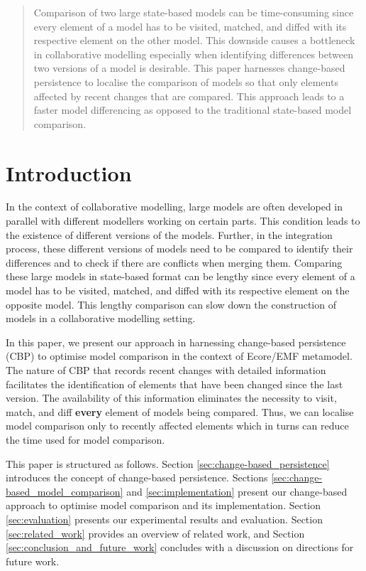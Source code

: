 \documentclass{llncs}
\begin{document}
\begin{abstract}
Comparison of two large state-based models can be time-consuming since every element of a model has to be visited, matched, and diffed with its respective element on the other model. This downside causes a bottleneck in collaborative modelling especially when identifying differences between two versions of a model is desirable. This paper harnesses change-based persistence to localise the comparison of models so that only elements affected by recent changes that are compared. This approach leads to a faster model differencing as opposed to the traditional state-based model comparison. 
\end{abstract}

\vspace{-20pt}
\section{Introduction}
\label{sec:introduction}
In the context of collaborative modelling, large models are often developed in parallel with different modellers working on certain parts. This condition leads to the existence of different versions of the models. Further, in the integration process, these different versions of models need to be compared to identify their differences and to check if there are conflicts when merging them. Comparing these large models in state-based format can be lengthy since every element of a model has to be visited, matched, and diffed with its respective element on the opposite model. 
This lengthy comparison can slow down the construction of models in a collaborative modelling setting. 

In this paper, we present our approach in harnessing change-based persistence (CBP) to optimise model comparison in the context of Ecore/EMF metamodel. The nature of CBP that records recent changes with detailed information facilitates the identification of elements that have been changed since the last version. The availability of this information eliminates the necessity to visit, match, and diff \textbf{every} element of models being compared. Thus, we can localise model comparison only to recently affected elements which in turns can reduce the time used for model comparison.

This paper is structured as follows. Section \ref{sec:change-based_persistence} introduces the concept of change-based persistence. Sections \ref{sec:change-based_model_comparison} and \ref{sec:implementation} present our change-based approach to optimise model comparison and its implementation. Section \ref{sec:evaluation} presents our experimental results and evaluation. Section \ref{sec:related_work} provides an overview of related work, and Section \ref{sec:conclusion_and_future_work} concludes with a discussion on directions for future work.
\end{document}
